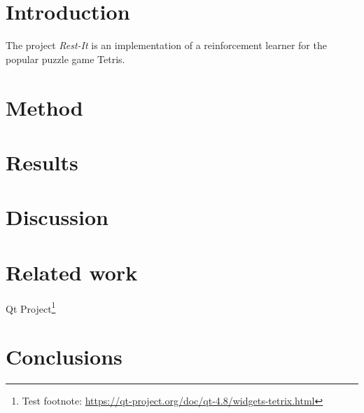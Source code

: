 \documentclass{ml}
\begin{document}

\section{Introduction}
The project \textit{Rest-It} is an implementation of a reinforcement learner for the popular puzzle game Tetris. 


\section{Method}

\section{Results}

\section{Discussion}

\section{Related work}
\cite{wwwtetrix}
Qt Project\footnote{Test footnote: \url{https://qt-project.org/doc/qt-4.8/widgets-tetrix.html}}
\cite{szepesvari2010algorithms}
\cite{szita2006learning}
\cite{carr2005applying}
\cite{gross2008learningto}

\section{Conclusions}

\newpage


\end{document}
